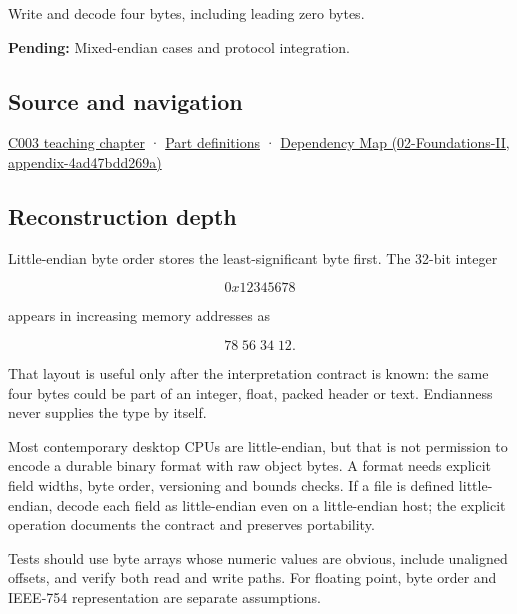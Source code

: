 Write and decode four bytes, including leading zero bytes.

\textbf{Pending:} Mixed-endian cases and protocol integration.

\subsection{Source and navigation}\label{appendix-367b6abf460e-source-and-navigation}

\hyperref[01-foundations-i-ch002-where-the-bytes-live]{C003 teaching chapter} · \hyperref[appendix-fd090d982a15-m003---parts-41-60]{Part definitions} · \href{../02-Foundations-II/main.pdf\#nameddest=appendix-4ad47bdd269a}{Dependency Map (02-Foundations-II, appendix-4ad47bdd269a)}

\subsection{Reconstruction depth}\label{appendix-367b6abf460e-reconstruction-depth}

Little-endian byte order stores the least-significant byte first. The 32-bit integer

\[
0x12345678
\]

appears in increasing memory addresses as

\[
78\;56\;34\;12.
\]

That layout is useful only after the interpretation contract is known: the same four bytes could be part of an integer, float, packed header or text. Endianness never supplies the type by itself.

Most contemporary desktop CPUs are little-endian, but that is not permission to encode a durable binary format with raw object bytes. A format needs explicit field widths, byte order, versioning and bounds checks. If a file is defined little-endian, decode each field as little-endian even on a little-endian host; the explicit operation documents the contract and preserves portability.

Tests should use byte arrays whose numeric values are obvious, include unaligned offsets, and verify both read and write paths. For floating point, byte order and IEEE-754 representation are separate assumptions.
